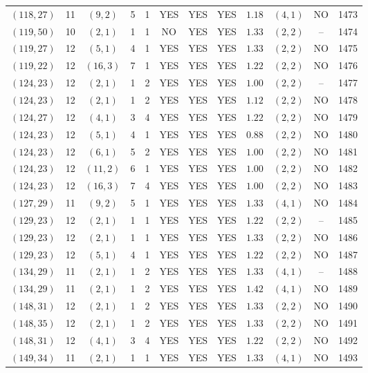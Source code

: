 \begin{longtable}{|c|c|c|c|c|c|c|c|c|c|c|c|}
$(118,27)$ & 11 & $(9,2)$ & 5 & 1 & YES & YES & YES & $1.18$ & $(4,1)$ & NO & 1473\\
$(119,50)$ & 10 & $(2,1)$ & 1 & 1 & NO & YES & YES & $1.33$ & $(2,2)$ & -- & 1474\\
$(119,27)$ & 12 & $(5,1)$ & 4 & 1 & YES & YES & YES & $1.33$ & $(2,2)$ & NO & 1475\\
$(119,22)$ & 12 & $(16,3)$ & 7 & 1 & YES & YES & YES & $1.22$ & $(2,2)$ & NO & 1476\\
$(124,23)$ & 12 & $(2,1)$ & 1 & 2 & YES & YES & YES & $1.00$ & $(2,2)$ & -- & 1477\\
$(124,23)$ & 12 & $(2,1)$ & 1 & 2 & YES & YES & YES & $1.12$ & $(2,2)$ & NO & 1478\\
$(124,27)$ & 12 & $(4,1)$ & 3 & 4 & YES & YES & YES & $1.22$ & $(2,2)$ & NO & 1479\\
$(124,23)$ & 12 & $(5,1)$ & 4 & 1 & YES & YES & YES & $0.88$ & $(2,2)$ & NO & 1480\\
$(124,23)$ & 12 & $(6,1)$ & 5 & 2 & YES & YES & YES & $1.00$ & $(2,2)$ & NO & 1481\\
$(124,23)$ & 12 & $(11,2)$ & 6 & 1 & YES & YES & YES & $1.00$ & $(2,2)$ & NO & 1482\\
$(124,23)$ & 12 & $(16,3)$ & 7 & 4 & YES & YES & YES & $1.00$ & $(2,2)$ & NO & 1483\\
$(127,29)$ & 11 & $(9,2)$ & 5 & 1 & YES & YES & YES & $1.33$ & $(4,1)$ & NO & 1484\\
$(129,23)$ & 12 & $(2,1)$ & 1 & 1 & YES & YES & YES & $1.22$ & $(2,2)$ & -- & 1485\\
$(129,23)$ & 12 & $(2,1)$ & 1 & 1 & YES & YES & YES & $1.33$ & $(2,2)$ & NO & 1486\\
$(129,23)$ & 12 & $(5,1)$ & 4 & 1 & YES & YES & YES & $1.22$ & $(2,2)$ & NO & 1487\\
$(134,29)$ & 11 & $(2,1)$ & 1 & 2 & YES & YES & YES & $1.33$ & $(4,1)$ & -- & 1488\\
$(134,29)$ & 11 & $(2,1)$ & 1 & 2 & YES & YES & YES & $1.42$ & $(4,1)$ & NO & 1489\\
$(148,31)$ & 12 & $(2,1)$ & 1 & 2 & YES & YES & YES & $1.33$ & $(2,2)$ & NO & 1490\\
$(148,35)$ & 12 & $(2,1)$ & 1 & 2 & YES & YES & YES & $1.33$ & $(2,2)$ & NO & 1491\\
$(148,31)$ & 12 & $(4,1)$ & 3 & 4 & YES & YES & YES & $1.22$ & $(2,2)$ & NO & 1492\\
$(149,34)$ & 11 & $(2,1)$ & 1 & 1 & YES & YES & YES & $1.33$ & $(4,1)$ & NO & 1493\\

\end{longtable}
